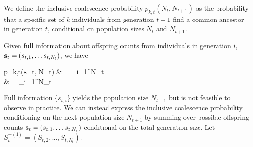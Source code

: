 \documentclass{article}
\let\oldalign\align
\let\oldendalign\endalign
\renewenvironment{align}{\linenomathNonumbers\oldalign}{\oldendalign\endlinenomath}
\begin{document}
We define the inclusive coalescence probability $p_{k,t}(N_t, N_{t+1})$ as the probability that a specific set of $k$ individuals from generation $t+1$ find a common ancestor in generation $t$, conditional on population sizes $N_t$ and $N_{t+1}$.

Given full information about offspring counts from individuals in generation $t$, ${\bf s}_t = (s_{t,1}, \dots s_{t, N_t})$, we have

{\allowdisplaybreaks
	\begin{align}
		p_{k,t}({\bf s}_t, N_t)
			& = \sum_{i=1}^{N_t}  \nonumber\\
			& = \sum_{i=1}^{N_t} %
	\end{align}
}

Full information $\{s_{t,i}\}$ yields the population size $N_{t+1}$ but is not feasible to observe in practice.
We can instead express the inclusive coalescence probability conditioning on the next population size $N_{t+1}$ by summing over possible offspring counts ${\bf s}_t = (s_{t,1}, \dots s_{t, N_t})$ conditional on the total generation size.
Let $S_t^{-(1)} = (S_{t,2}, \dots, S_{t, N_t})$.
\end{document}
